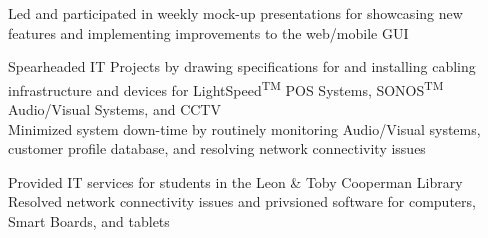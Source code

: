\documentclass[a4paper]{Resume}
\begin{document}
\begin{onehalfspace}
\pt Led and participated in weekly mock-up presentations for showcasing new features and implementing improvements to the web/mobile GUI  \\

\sectionsep



\pt Spearheaded IT Projects by drawing specifications for and installing cabling infrastructure and devices for LightSpeed\textsuperscript{TM} POS Systems,  SONOS\textsuperscript{TM} Audio/Visual Systems, and CCTV \\

\pt Minimized system down-time by routinely monitoring Audio/Visual systems, customer profile database, and resolving network connectivity issues \\



\sectionsep



\pt Provided IT services for students in the Leon \& Toby Cooperman Library \\

\pt Resolved network connectivity issues and privsioned software for computers, Smart Boards, and tablets \\
\sectionsep

\end{onehalfspace}

\end{document}
